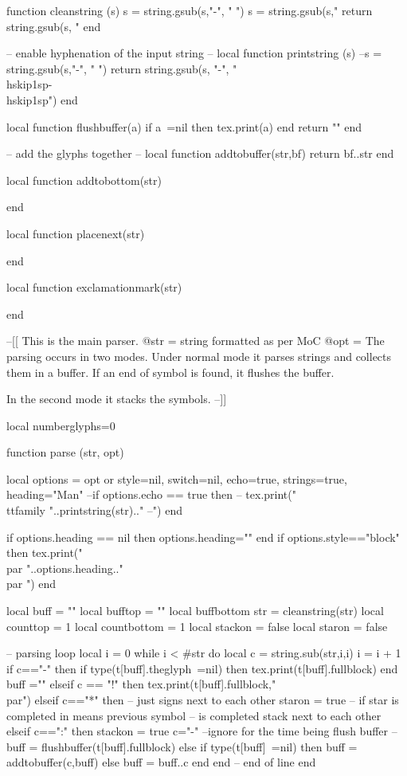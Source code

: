 \documentclass{article}
\begin{document}
\begin{luacode*}
function cleanstring (s)
  s = string.gsub(s,"-", " ")
  s = string.gsub(s,"%
  return string.gsub(s, "%
end

-- enable hyphenation of the input string
-- 
local function printstring (s)
  --s = string.gsub(s,"-", " ")
			  return string.gsub(s, "-", "\\hskip1sp-\\hskip1sp")
end

local function flushbuffer(a)
   if a~=nil then tex.print(a) end
   return ""
end

-- add the glyphs together
-- 
local function addtobuffer(str,bf)
    return bf..str
end

local function addtobottom(str)

end

local function placenext(str)

end

local function exclamationmark(str)
   
end



--[[
This is the main parser. 
@str = string formatted as per MoC 
@opt = 
The parsing occurs in two modes. Under normal mode
it parses strings and collects them in a buffer. If an
end of symbol is found, it flushes the buffer.

In the second mode it stacks the symbols.
--]]

local numberglyphs=0

function parse (str, opt) 

  local options = opt or {style=nil,
                    switch=nil,
                    echo=true,
                    strings=true,
                    heading="Man"}
  --if options.echo == true then 
        -- tex.print("{\\ttfamily "..printstring(str).." --}") end

  if options.heading == nil then options.heading="" end
  if options.style=="block" then  
     tex.print("\\par "..options.heading.."\\par ") 
  end

  local buff = ""
  local bufftop = "" 
  local buffbottom
  str = cleanstring(str)
  local counttop = 1
  local countbottom = 1
  local stackon = false
  local staron = false

-- parsing loop
  local i = 0
  while i < #str do
    local c = string.sub(str,i,i) 
    i = i + 1	
    if c=="-" then 
       if type(t[buff].theglyph~=nil) then
         tex.print(t[buff].fullblock)
       end
       buff =""
     elseif c == "!" then
       tex.print(t[buff].fullblock,"\\par")
     elseif c=="*" then -- just signs next to each other
       staron = true
       -- if star is completed in means previous symbol
       -- is completed stack next to each other
     elseif c==":" then
         stackon = true
         c="-" --ignore for the time being flush buffer
		   --buff = flushbuffer(t[buff].fullblock)
     else
       if type(t[buff]~=nil) then
            buff = addtobuffer(c,buff)
       else
            buff = buff..c
       end
  end
    -- end of line
  end


\end{luacode*}
\end{document}
